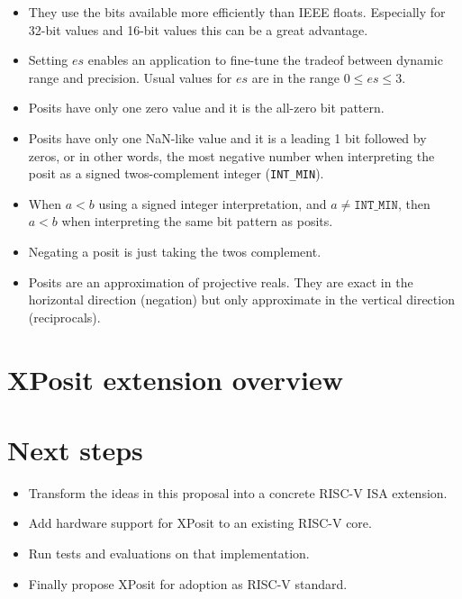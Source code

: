 \begin{itemize}
\item
  They use the bits available more efficiently than IEEE floats. Especially
  for 32-bit values and 16-bit values this can be a great advantage.
\item
  Setting $es$ enables an application to fine-tune the tradeof between dynamic
  range and precision. Usual values for $es$ are in the range $0 \le es \le 3$.
\item
  Posits have only one zero value and it is the all-zero bit pattern.
\item
  Posits have only one NaN-like value and it is a leading 1 bit followed by
  zeros, or in other words, the most negative number when interpreting the posit as a
  signed twos-complement integer ({\tt INT\_MIN}).
\item
  When $a < b$ using a signed integer interpretation, and $a \ne \texttt{INT\_MIN}$,
  then $a < b$ when interpreting the same bit pattern as posits. 
\item
  Negating a posit is just taking the twos complement.
\item
  Posits are an approximation of projective reals. They are exact in the
  horizontal direction (negation) but only approximate in the vertical
  direction (reciprocals).
\end{itemize}

\section{XPosit extension overview}

\section{Next steps}

\begin{itemize}
\item
  Transform the ideas in this proposal into a concrete RISC-V ISA
  extension.
\item
  Add hardware support for XPosit to an existing RISC-V core.
\item
  Run tests and evaluations on that implementation.
\item
  Finally propose XPosit for adoption as RISC-V standard.
\end{itemize}
